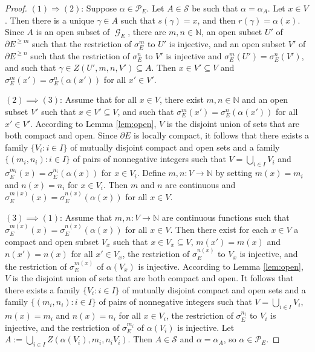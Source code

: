 \documentclass[12pt, a4paper]{amsart}
\numberwithin{equation}{section}
\theoremstyle{definition}
\theoremstyle{remark}
\begin{document}
\begin{proof}
	$(1)\Rightarrow (2)$: Suppose $\alpha\in\mathcal{P}_E$. Let 
	$A\in\mathcal{S}$ be such that $\alpha=\alpha_A$. Let $x\in V$. Then there 
	is a unique $\gamma\in A$ such that $s(\gamma)=x$, and then 
	$r(\gamma)=\alpha(x)$. Since $A$ is an open subset of ${\operatorname{\mathcal{G}}}_E$, there are 
	$m,n\in{\mathbb{N}}$, an open subset $U'$ of $\partial E^{\ge m}$ such that the 
	restriction of $\sigma_E^m$ to $U'$ is injective, and an open subset $V'$ 
	of $\partial E^{\ge n}$ such that the restriction of $\sigma_E^n$ to $V'$ 
	is injective and $\sigma_E^m(U')=\sigma_E^n(V')$, and such that $\gamma\in 
	Z(U',m,n,V')\subseteq A$. Then $x\in V'\subseteq V$ and 
	$\sigma_E^m(x')=\sigma_E^n(\alpha(x'))$ for all $x'\in V'$.
	
	$(2)\implies (3)$: Assume that for all $x\in V$, there exist $m,n\in{\mathbb{N}}$ 
	and an open subset $V'$ such that $x\in V'\subseteq V$, and such that 
	$\sigma_E^m(x')=\sigma_E^n(\alpha(x'))$ for all $x'\in V'$. According to 
	Lemma \ref{lem:open}, $V$ is the disjoint union of sets that are both 
	compact and open. Since $\partial E$ is locally compact, it follows that 
	there exists a family $\{V_i:i\in I\}$ of mutually disjoint compact and 
	open sets and a family $\{(m_i,n_i):i\in I\}$ of pairs of nonnegative 
	integers such that $V=\bigcup_{i\in I}V_i$ and 
	$\sigma_E^{m_i}(x)=\sigma_E^{n_i}(\alpha(x))$ for $x\in V_i$. Define 
	$m,n:V\to{\mathbb{N}}$ by setting $m(x)=m_i$ and $n(x)=n_i$ for $x\in V_i$. Then $m$ 
	and $n$ are continuous and $\sigma_E^{m(x)}(x)=\sigma_E^{n(x)}(\alpha(x))$ 
	for all $x\in V$.
	
	$(3)\implies (1)$: Assume that $m,n:V\to{\mathbb{N}}$ are continuous functions such 
	that $\sigma_E^{m(x)}(x)=\sigma_E^{n(x)}(\alpha(x))$ for all $x\in V$. 
	Then there exist for each $x\in V$ a compact and open subset $V_x$ such 
	that $x\in V_x\subseteq V$, $m(x')=m(x)$ and $n(x')=n(x)$ for all $x'\in 
	V_x$, the restriction of $\sigma_E^{n(x)}$ to $V_x$ is injective, and the 
	restriction of $\sigma_E^{m(x)}$ of $\alpha(V_x)$ is injective. According 
	to Lemma \ref{lem:open}, $V$ is the disjoint union of sets that are both 
	compact and open. It follows that there exists a family $\{V_i:i\in I\}$ 
	of mutually disjoint compact and open sets and a family $\{(m_i,n_i):i\in 
	I\}$ of pairs of nonnegative integers such that $V=\bigcup_{i\in I}V_i$, 
	$m(x)=m_i$ and $n(x)=n_i$ for all $x\in V_i$, the restriction of 
	$\sigma_E^{n_i}$ to $V_i$ is injective, and the restriction of 
	$\sigma_E^{m_i}$ of $\alpha(V_i)$ is injective. Let $A:=\bigcup_{i\in 
	I}Z(\alpha(V_i),m_i,n_iV_i)$. Then $A\in\mathcal{S}$ and 
	$\alpha=\alpha_A$, so $\alpha\in\mathcal{P}_E$.
\end{proof}
\end{document}
